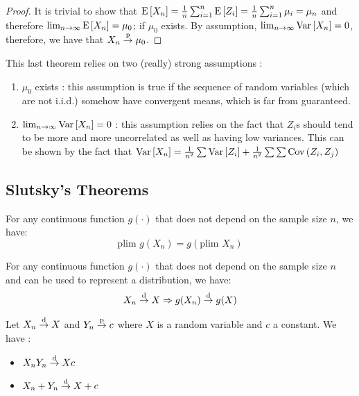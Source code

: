 \begin{proof}
It is trivial to show that $\operatorname{E}\left[X_n\right] = \frac{1}{n} \sum_{i=1}^{n} \operatorname{E}\left[Z_i\right] = \frac{1}{n} \sum_{i=1}^{n} \mu_i = \mu_n$ and therefore $\lim_{n\to\infty} \operatorname{E}\left[X_n\right] = \mu_0$; if $\mu_0$ exists. By assumption, $\lim_{n\to\infty} \operatorname{Var}\left[X_n\right] = 0$, therefore, we have that $X_n \overset{\text{p}}{\to} \mu_0$.
\end{proof}

This last theorem relies on two (really) strong assumptions :\begin{enumerate}
\item $\mu_0$ exists : this assumption is true if the sequence of random variables (which are not i.i.d.) somehow have convergent means, which is far from guaranteed.
\item $\lim_{n\to\infty} \operatorname{Var}\left[X_n\right] = 0$ : this assumption relies on the fact that $Z_i$s should tend to be more and more uncorrelated as well as having low variances. This can be shown by the fact that $\operatorname{Var}\left[X_n\right] = \frac{1}{n^2} \sum \operatorname{Var}\left[Z_i\right] +  \frac{1}{n^2} \sum \sum \operatorname{Cov}\left(Z_i, Z_j\right)$
\end{enumerate}

\subsection{Slutsky's Theorems}

\begin{theorem}
For any continuous function $g(\cdot)$ that does not depend on the sample size $n$, we have: $$\text{plim } g(X_n) = g(\text{plim }X_n)$$
\end{theorem}

\begin{theorem}
For any continuous function $g(\cdot)$ that does not depend on the sample size $n$ and can be used to represent a distribution, we have: $$X_n \overset{\text{d}}{\to} X \Rightarrow g(X_n)\overset{\text{d}}{\to} g(X)$$
\end{theorem}

\begin{proposition}
Let $X_n\overset{\text{d}}{\to} X$ and $Y_n \overset{\text{p}}{\to} c$ where $X$ is a random variable and $c$ a constant. We have : \begin{itemize}
\item $X_nY_n \overset{\text{d}}{\to} Xc$
\item $X_n + Y_n \overset{\text{d}}{\to} X + c$
\end{itemize}
\end{proposition}

